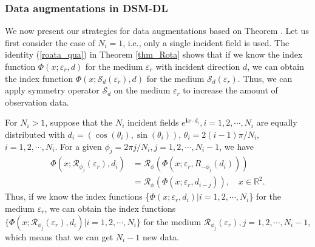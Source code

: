 \documentclass{article}
\begin{document}
\subsubsection{Data augmentations in DSM-DL}
\label{sec_Data_aug}
We now present our strategies for data augmentations based on Theorem . Let us first consider the case of $N_{i}=1$, i.e., only a single incident field is used. The identity (\ref{roata_qua}) in Theorem \ref{thm_Rota} shows that if we know the index function $\Phi(x;\varepsilon_{r},d)$ for the medium $\varepsilon_{r}$ with incident direction $d$, we can obtain the index function $\Phi(x;\mathcal{S}_{d}(\varepsilon_{r}),d)$ for the medium $\mathcal{S}_{d}(\varepsilon_{r})$. Thus, we can apply symmetry operator $\mathcal{S}_{d}$ on the medium $\varepsilon_{r}$ to increase the amount of observation data.

For $N_i>1$, suppose that the $N_i$ incident fields $e^{\mathbf{i}x\cdot d_i},i=1,2,\cdots,N_i$ are equally distributed with $d_i=(\cos(\theta_i), \sin(\theta_i))$, $\theta_i = 2(i-1)\pi/N_i$, $i=1,2,\cdots ,N_i$. For a given $\phi_j= 2\pi j/N_i, j=1,2,\cdots,N_i-1$, we have
\begin{equation}
	\begin{split}
		\Phi(x;\mathcal{R}_{\phi_j}(\varepsilon_{r}),d_i)&=\mathcal{R}_{\phi}(\Phi(x;\varepsilon_{r},R_{-\phi_j}(d_i)))\\
		&=\mathcal{R}_{\phi}(\Phi(x;\varepsilon_{r},d_{i-j})),
		\quad x\in \mathbb{R}^2.
	\end{split}
\label{equa26}
\end{equation} 
Thus, if we know the index functions \{$\Phi(x;\varepsilon_{r},d_{i})| i=1,2,\cdots,N_i$\} for the medium $\varepsilon_{r}$, we can obtain the index functions $\{\Phi(x;\mathcal{R}_{\phi_j}(\varepsilon_{r}),d_{i})| i=1,2,\cdots,N_i\}$ for the medium $\mathcal{R}_{\phi_j}(\varepsilon_{r}), j=1,2,\cdots,N_{i}-1$, which means that we can get $N_i-1$ new data.
\end{document}
